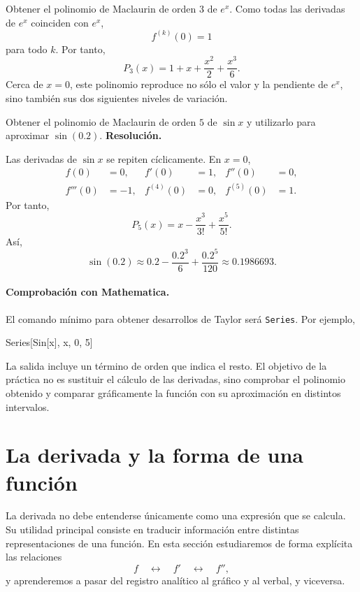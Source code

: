 \begin{example}
Obtener el polinomio de Maclaurin de orden $3$ de $e^x$. Como todas las derivadas de $e^x$ coinciden con $e^x$,
\[
f^{(k)}(0)=1
\]
para todo $k$. Por tanto,
\[
\boxed{
P_3(x)=1+x+\frac{x^2}{2}+\frac{x^3}{6}
}.
\]
Cerca de $x=0$, este polinomio reproduce no sólo el valor y la pendiente de $e^x$, sino también sus dos siguientes niveles de variación.
\end{example}

\begin{solvedexercise}
Obtener el polinomio de Maclaurin de orden $5$ de $\sin x$ y utilizarlo para aproximar $\sin(0.2)$.
\tcblower
\textbf{Resolución.}\par\smallskip
Las derivadas de $\sin x$ se repiten cíclicamente. En $x=0$,
\begin{align*}
f(0)&=0, & f'(0)&=1, & f''(0)&=0,\\
f'''(0)&=-1, & f^{(4)}(0)&=0, & f^{(5)}(0)&=1.
\end{align*}
Por tanto,
\[
P_5(x)=x-\frac{x^3}{3!}+\frac{x^5}{5!}.
\]
Así,
\[
\sin(0.2)
\approx
0.2-\frac{0.2^3}{6}+\frac{0.2^5}{120}
\approx0.1986693.
\]
\end{solvedexercise}

\paragraph{Comprobación con Mathematica.}
El comando mínimo para obtener desarrollos de Taylor será \texttt{Series}. Por ejemplo,
\begin{mathematicacode}
Series[Sin[x], {x, 0, 5}]
\end{mathematicacode}
La salida incluye un término de orden que indica el resto. El objetivo de la práctica no es sustituir el cálculo de las derivadas, sino comprobar el polinomio obtenido y comparar gráficamente la función con su aproximación en distintos intervalos.

\section{La derivada y la forma de una función}
\label{sec:forma-derivada}

La derivada no debe entenderse únicamente como una expresión que se calcula. Su utilidad principal consiste en traducir información entre distintas representaciones de una función. En esta sección estudiaremos de forma explícita las relaciones
\[
f\quad\longleftrightarrow\quad f'\quad\longleftrightarrow\quad f'',
\]
y aprenderemos a pasar del registro analítico al gráfico y al verbal, y viceversa.


